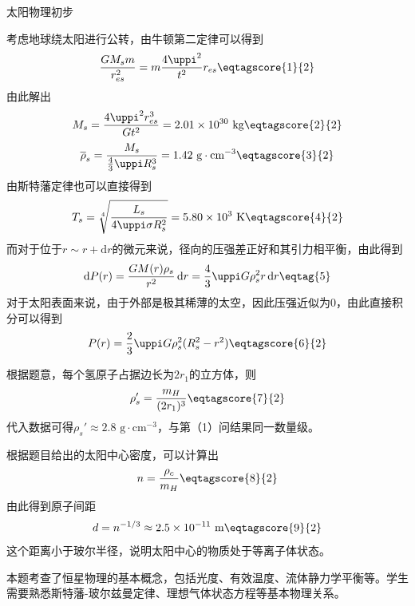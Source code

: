 \documentclass[exam]{cphos}
\begin{document}
\begin{problem}[40]{太阳物理初步}
\begin{solution}
考虑地球绕太阳进行公转，由牛顿第二定律可以得到
\begin{equation}
    \frac{GM_s m}{r_{es}^2} = m \frac{4\uppi^2}{t^2} r_{es} \eqtagscore{1}{2}
\end{equation}
由此解出
\begin{equation}
    M_s = \frac{4\uppi^2 r_{es}^3}{Gt^2} = 2.01 \times 10^{30} \text{~kg} \eqtagscore{2}{2}
\end{equation}
\begin{equation}
    \overline{\rho}_s = \frac{M_s}{\frac{4}{3}\uppi R_s^3} = 1.42 \text{~g}\cdot\text{cm}^{-3} \eqtagscore{3}{2}
\end{equation}
由斯特藩定律也可以直接得到
\begin{equation}
    T_s = \sqrt[4]{\frac{L_s}{4\uppi\sigma R_s^2}} = 5.80 \times 10^{3} \text{~K} \eqtagscore{4}{2}
\end{equation}
而对于位于$r\sim r+\mathrm{d}r$的微元来说，径向的压强差正好和其引力相平衡，由此得到
\begin{equation}
    \mathrm{d}P(r) = \frac{GM(r)\rho_s}{r^2}\,\mathrm{d}r = \frac{4}{3}\uppi G\rho_s^2 r\,\mathrm{d}r \eqtag{5}
\end{equation}
对于太阳表面来说，由于外部是极其稀薄的太空，因此压强近似为0，由此直接积分可以得到
\begin{equation}
    P(r) = \frac{2}{3}\uppi G\rho_s^2(R_s^2 - r^2) \eqtagscore{6}{2}
\end{equation}

根据题意，每个氢原子占据边长为$2r_1$的立方体，则
\begin{equation}
    \rho_s' = \frac{m_H}{(2r_1)^3} \eqtagscore{7}{2}
\end{equation}
代入数据可得$\rho_s' \approx 2.8\text{~g}\cdot\text{cm}^{-3}$，与第（1）问结果同一数量级。

根据题目给出的太阳中心密度，可以计算出
\begin{equation}
    n = \frac{\rho_c}{m_H} \eqtagscore{8}{2}
\end{equation}
由此得到原子间距
\begin{equation}
    d = n^{-1/3} \approx 2.5 \times 10^{-11} \text{~m} \eqtagscore{9}{2}
\end{equation}
这个距离小于玻尔半径，说明太阳中心的物质处于等离子体状态。

\scoring

\end{solution}

\begin{problemappendix}
本题考查了恒星物理的基本概念，包括光度、有效温度、流体静力学平衡等。学生需要熟悉斯特藩-玻尔兹曼定律、理想气体状态方程等基本物理关系。
\end{problemappendix}

\end{problem}
\end{document}

